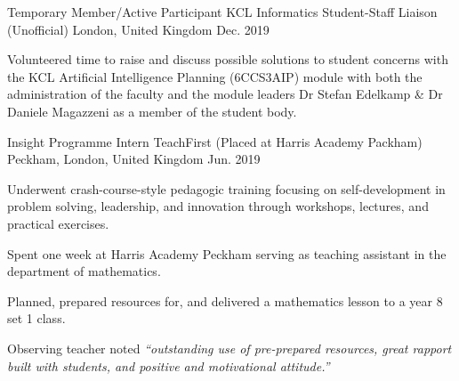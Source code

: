 

\begin{cventries}

  \cventry
  {Temporary Member/Active Participant} %
  {KCL Informatics Student-Staff Liaison (Unofficial)} %
  {London, United Kingdom} %
  {Dec. 2019} %
  {
    \begin{cvitems} %
      \item {Volunteered time to raise and discuss possible solutions to student concerns with the KCL Artificial Intelligence Planning (6CCS3AIP) module with both the administration of the faculty and the module leaders Dr Stefan Edelkamp \& Dr Daniele Magazzeni as a member of the student body.}
    \end{cvitems}
  }

  \cventry
  {Insight Programme Intern} %
  {TeachFirst (Placed at Harris Academy Packham)} %
  {Peckham, London, United Kingdom} %
  {Jun. 2019} %
  {
    \begin{cvitems} %
      \item {Underwent crash-course-style pedagogic training focusing on self-development in problem solving, leadership, and innovation through workshops, lectures, and practical exercises.}
      \item {Spent one week at Harris Academy Peckham serving as teaching assistant in the department of mathematics.}
      \item {Planned, prepared resources for, and delivered a mathematics lesson to a year 8 set 1 class.}
      \item {Observing teacher noted \textit{``outstanding use of pre-prepared resources, great rapport built with students, and positive and motivational attitude.''}}
    \end{cvitems}
  }


\end{cventries}
